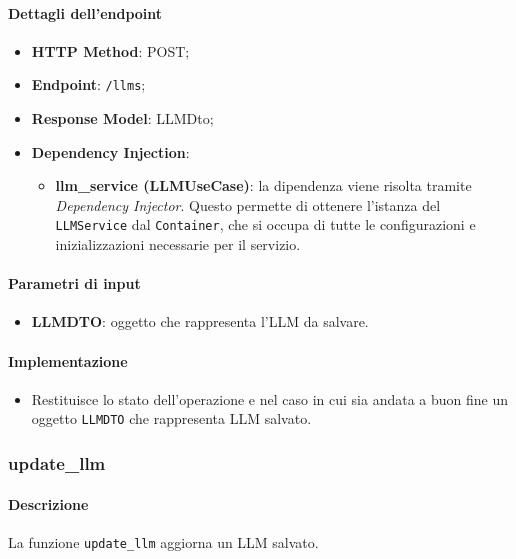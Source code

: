 \paragraph{Dettagli dell'endpoint}
\begin{itemize}
    \item \textbf{HTTP Method}: POST;
    \item \textbf{Endpoint}: \texttt{/llms};
    \item \textbf{Response Model}: LLMDto;
    \item \textbf{Dependency Injection}:
    \begin{itemize}
        \item \textbf{llm\_service (LLMUseCase)}: la dipendenza viene risolta tramite \textit{Dependency Injector}. Questo permette di ottenere l'istanza del \texttt{LLMService} dal \texttt{Container}, che si occupa di tutte le configurazioni e inizializzazioni necessarie per il servizio.
    \end{itemize}
\end{itemize}

\paragraph{Parametri di input}
\begin{itemize}
    \item \textbf{LLMDTO}: oggetto che rappresenta l'LLM da salvare.
\end{itemize}

\paragraph{Implementazione}
\begin{itemize}
    \item Restituisce lo stato dell'operazione e nel caso in cui sia andata a buon fine un oggetto \texttt{LLMDTO} che rappresenta LLM salvato.
\end{itemize}

\subsubsection{update\_llm}
\label{sec:update_LLM}

\paragraph{Descrizione}
La funzione \texttt{update\_llm} aggiorna un LLM salvato.

